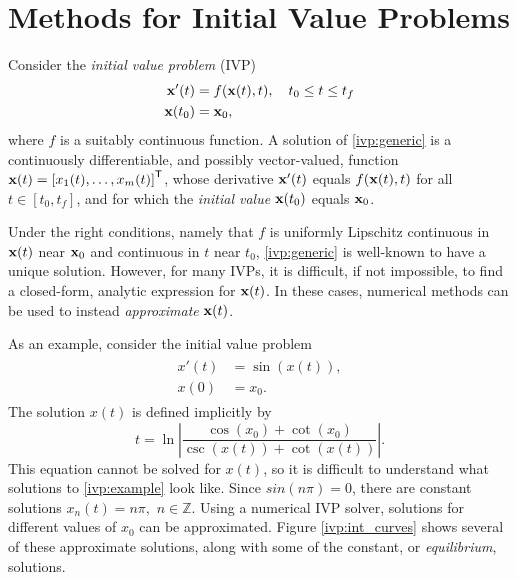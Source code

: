 \label{lab:ivp}


\section*{Methods for Initial Value Problems}
Consider the \textit{initial value problem} (IVP)
\begin{align}
	\begin{split}
\mathbf{x}'(t) &= f(\mathbf{x}(t),t),\quad t_0 \leq t \leq t_f \\
\mathbf{x}(t_0) &= \mathbf{x}_0, 
	\end{split}
	\label{ivp:generic}
\end{align}
where $f$ is a suitably continuous function.
A solution of \eqref{ivp:generic} is a continuously differentiable, and possibly vector-valued, function $\mathbf{x}(t) = \left[x_1(t),\hdots,x_m(t)\right]^{\mathsf T}$, whose derivative $\mathbf{x}'(t)$ equals $f(\mathbf{x}(t),t)$ for all $t \in [t_0,t_f]$, and for which the \textit{initial value} $\mathbf{x}(t_0)$ equals $\mathbf{x}_0$.

Under the right conditions, namely that $f$ is uniformly Lipschitz continuous in $\mathbf{x}(t)$ near $\mathbf{x}_0$ and continuous in $t$ near $t_0$, \eqref{ivp:generic} is well-known to have a unique solution.
However, for many IVPs, it is difficult, if not impossible, to find a closed-form, analytic expression for $\mathbf{x}(t)$.
In these cases, numerical methods can be used to instead \textit{approximate} $\mathbf{x}(t)$.

As an example, consider the initial value problem
\begin{align}
	\begin{split}
x'(t) &= \sin(x(t)), \\
x(0) &= x_0.
	\end{split}\label{ivp:example}
\end{align}
The solution $x(t)$ is defined implicitly by
\[t = \ln \left|\frac{\cos(x_0) + \cot(x_0)}{\csc(x(t)) + \cot(x(t))} \right|.\]
This equation cannot be solved for $x(t)$, so it is difficult to understand what solutions to \eqref{ivp:example} look like.
Since $sin(n\pi)=0$, there are constant solutions $x_n(t) = n \pi,$ $n \in \mathbb{Z}$.
Using a numerical IVP solver, solutions for different values of $x_0$ can be approximated.
Figure \ref{ivp:int_curves} shows several of these approximate solutions, along with some of the constant, or \textit{equilibrium}, solutions.


